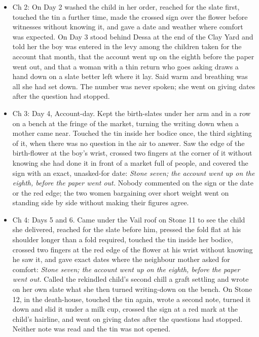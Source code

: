 \documentclass{design/chronicle}
\begin{document}
{\begin{itemize}[leftmargin=1.4em,itemsep=1pt,topsep=3pt,parsep=0pt]
\item Ch 2: On Day 2 washed the child in her order, reached for the slate first, touched the tin a further time, made the crossed sign over the flower before witnesses without knowing it, and gave a date and weather where comfort was expected. On Day 3 stood behind Dessa at the end of the Clay Yard and told her the boy was entered in the levy among the children taken for the account that month, that the account went up on the eighth before the paper went out, and that a woman with a thin return who goes asking draws a hand down on a slate better left where it lay. Said warm and breathing was all she had set down. The number was never spoken; she went on giving dates after the question had stopped.

\item Ch 3: Day 4, Account-day. Kept the birth-slates under her arm and in a row on a bench at the fringe of the market, turning the writing down when a mother came near. Touched the tin inside her bodice once, the third sighting of it, when there was no question in the air to answer. Saw the edge of the birth-flower at the boy’s wrist, crossed two fingers at the corner of it without knowing she had done it in front of a market full of people, and covered the sign with an exact, unasked-for date: \emph{Stone seven; the account went up on the eighth, before the paper went out.} Nobody commented on the sign or the date or the red edge; the two women bargaining over short weight went on standing side by side without making their figures agree.

\end{itemize}

\begin{itemize}[leftmargin=1.4em,itemsep=1pt,topsep=3pt,parsep=0pt]

\item Ch 4: Days 5 and 6. Came under the Vail roof on Stone 11 to see the child she delivered, reached for the slate before him, pressed the fold flat at his shoulder longer than a fold required, touched the tin inside her bodice, crossed two fingers at the red edge of the flower at his wrist without knowing he saw it, and gave exact dates where the neighbour mother asked for comfort: \emph{Stone seven; the account went up on the eighth, before the paper went out.} Called the rekindled child’s second chill a graft settling and wrote on her own slate what she then turned writing-down on the bench. On Stone 12, in the death-house, touched the tin again, wrote a second note, turned it down and slid it under a milk cup, crossed the sign at a red mark at the child’s hairline, and went on giving dates after the questions had stopped. Neither note was read and the tin was not opened.


\end{itemize}}
\end{document}
